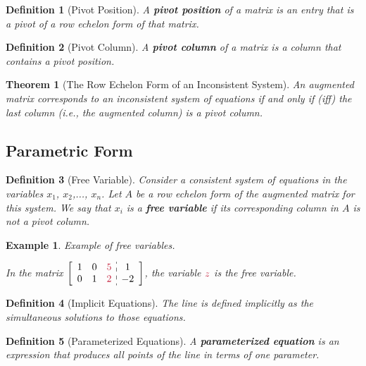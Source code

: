 \documentclass[12pt, a4paper]{article}
\newtheorem{thm}{Theorem}[subsection]
\newtheorem{df}{Definition}[subsection]
\newtheorem{eg}{Example}[subsection]
\begin{document}
\begin{df}[Pivot Position]
A \textbf{pivot position} of a matrix is an entry that is a pivot of a row echelon form of that matrix.
\end{df}
\begin{df}[Pivot Column]
A \textbf{pivot column} of a matrix is a column that contains a pivot position.
\end{df}

\begin{thm}[The Row Echelon Form of an Inconsistent System] An augmented matrix corresponds to an inconsistent system of equations if and only if (\emph{iff}) the last column (i.e., the augmented column) is a pivot column.
\end{thm}

\subsection{Parametric Form}
\begin{df}[Free Variable]
Consider a consistent system of equations in the variables $x_1$, $x_2$,..., $x_n$. Let $A$ be a row echelon form of the augmented matrix for this system. We say that $x_i$ is a \textbf{free variable} if its corresponding column in $A$ is not a pivot column.
\end{df}

\begin{eg} Example of free variables.

In the matrix $\left[\begin{array}{c:c}\begin{matrix}1&0&\textcolor{red}{5}\\0&1&\textcolor{red}{2}\end{matrix}&
\begin{matrix}1\\-2\end{matrix}\end{array}\right]$, the variable $\textcolor{red}{z}$ is the free variable.
\end{eg}

\begin{df}[Implicit Equations]
The line is defined implicitly as the simultaneous solutions to those equations.
\end{df}

\begin{df}[Parameterized Equations]
A \textbf{parameterized equation} is an expression that produces all points of the line in terms of one parameter. 
\end{df}
\end{document}
